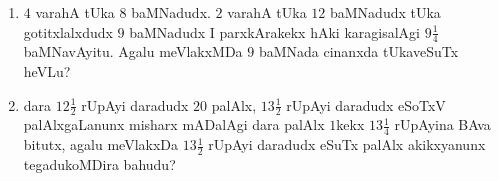 \begin{enumerate}[\rm(1)]
\item $4$ varahA tUka $8$ baMNadudx. $2$ varahA tUka $12$ baMNadudx tUka gotitxlalxdudx $9$ baMNadudx I parxkArakekx hAki karagisalAgi $9\tfrac{1}{4}$ baMNavAyitu. Agalu meVlakxMDa $9$ baMNada cinanxda tUkaveSuTx heVLu?

\item dara $12\tfrac{1}{2}$ rUpAyi daradudx $20$ palAlx, $13\tfrac{1}{2}$ rUpAyi daradudx eSoTxV palAlxgaLanunx misharx mADalAgi dara palAlx $1$kekx  $13\tfrac{1}{4}$ rUpAyina BAva bitutx, agalu meVlakxDa $13\tfrac{1}{2}$ rUpAyi daradudx eSuTx palAlx akikxyanunx tegadukoMDira bahudu?
\end{enumerate}

